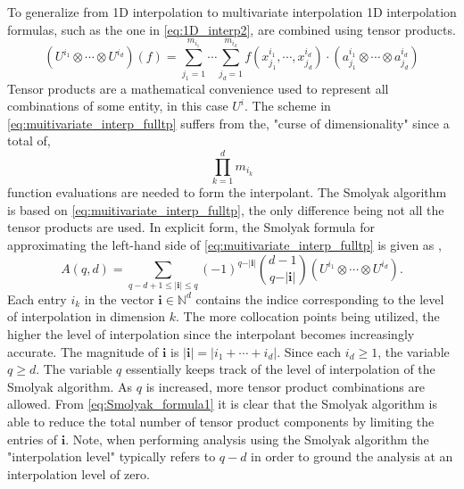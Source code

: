 To generalize from 1D interpolation to multivariate interpolation 1D interpolation formulas, such as the one in \ref{eq:1D_interp2}, are combined using tensor products.
\begin{equation} \label{eq:muitivariate_interp_fulltp}
    \left(U^{i_1} \otimes\cdots\otimes U^{i_d}\right)\left(f\right) = 
     \sum_{j_1=1}^{m_{i_1}} \cdots
      \sum_{j_d=1}^{m_{i_d}} f\left(
       x_{j_1}^{i_1},\cdots,x_{j_d}^{i_d}\right)\cdot
        \left(a_{j_1}^{i_1}\otimes\cdots\otimes a_{j_d}^{i_d}\right)
\end{equation}   
Tensor products are a mathematical convenience used to represent all combinations of some entity, in this case $U^i$. The scheme in \ref{eq:muitivariate_interp_fulltp} suffers from the, "curse of dimensionality" since a total of,
\begin{equation}
    \prod_{k=1}^d m_{i_k}
\end{equation}     
function evaluations are needed to form the interpolant. The Smolyak algorithm is based on \ref{eq:muitivariate_interp_fulltp}, the only difference being not all the tensor products are used. In explicit form, the Smolyak formula for approximating the left-hand side of \ref{eq:muitivariate_interp_fulltp} is given as \cite{NovakRitter},
\begin{equation} \label{eq:Smolyak_formula1}
    A\left(q,d\right) = 
     \sum_{q-d+1\leq \vert \textbf{i}\vert\leq q}
      \left(-1\right)^{q-\vert\textbf{i}\vert}
       \binom{d-1}{q-\vert\textbf{i}\vert}
        \left(U^{i_1} \otimes\cdots\otimes U^{i_d}\right).
\end{equation}
Each entry $i_k$ in the vector $\textbf{i} \in \mathbb{N}^d$ contains the indice corresponding to the level of interpolation in dimension $k$. The more collocation points being utilized, the higher the level of interpolation since the interpolant becomes increasingly accurate. The magnitude of $\textbf{i}$ is $\vert\textbf{i}\vert = \vert i_1 +\cdots+ i_d\vert$. Since each $i_d \geq 1$, the variable $q \geq d$. The variable $q$ essentially keeps track of the level of interpolation of the Smolyak algorithm. As $q$ is increased, more tensor product combinations are allowed. From \ref{eq:Smolyak_formula1} it is clear that the Smolyak algorithm is able to reduce the total number of tensor product components by limiting the entries of $\textbf{i}$. Note, when performing analysis using the Smolyak algorithm the "interpolation level" typically refers to $q-d$ in order to ground the analysis at an interpolation level of zero.

